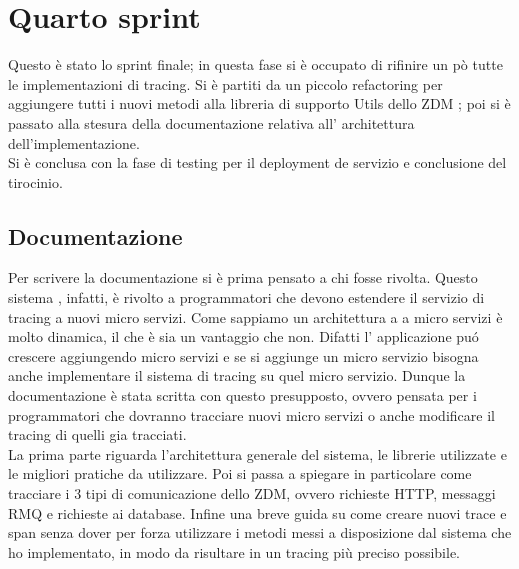 \documentclass[a4paper,12pt,titlepage,italian,openany]{report}
\begin{document}
\section{Quarto sprint}
Questo è stato lo sprint finale; in questa fase si è occupato di rifinire un pò tutte le implementazioni di tracing. Si è partiti da un piccolo refactoring per aggiungere tutti i nuovi metodi alla libreria di supporto Utils dello ZDM\cite{zdm:1} ; poi si è passato alla stesura della documentazione relativa all' architettura dell'implementazione.\\Si è conclusa con la fase di testing per il deployment de servizio e conclusione del tirocinio.
\subsection{Documentazione}
Per scrivere la documentazione si è prima pensato a chi fosse rivolta. Questo sistema , infatti, è rivolto a programmatori che devono estendere il servizio di tracing a nuovi micro servizi. Come sappiamo un architettura a a micro servizi è molto dinamica, il che è sia un vantaggio che non. Difatti l' applicazione puó crescere aggiungendo micro servizi e se si aggiunge un micro servizio bisogna anche implementare il sistema di tracing su quel micro servizio.
Dunque la documentazione è stata scritta con questo presupposto, ovvero pensata per i programmatori che dovranno tracciare nuovi micro servizi o anche modificare il tracing di quelli gia tracciati.\\
La prima parte riguarda l'architettura generale del sistema, le librerie utilizzate e le migliori pratiche da utilizzare. Poi si passa a spiegare in particolare come tracciare i 3 tipi di comunicazione dello ZDM\cite{zdm:1}, ovvero richieste HTTP, messaggi RMQ e richieste ai database. 
Infine una breve guida su come creare nuovi trace e span senza dover per forza utilizzare i metodi messi a disposizione dal sistema che ho implementato, in modo da risultare in un tracing più preciso possibile. 
\end{document}
